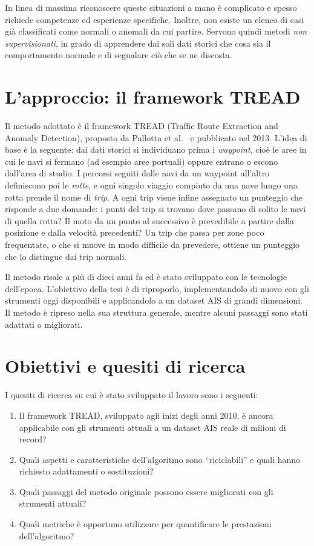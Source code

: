 In linea di massima riconoscere queste situazioni a mano è complicato e spesso richiede competenze ed esperienze
specifiche. Inoltre, non esiste un elenco di casi già classificati come normali o anomali
da cui partire.
Servono quindi metodi \emph{non supervisionati}, in grado di apprendere dai soli dati storici che cosa sia
il comportamento normale e di segnalare ciò che se ne discosta.

\section{L'approccio: il framework TREAD}\label{sec:intro_approach}

Il metodo adottato è il framework TREAD (Traffic Route Extraction and Anomaly Detection), proposto
da Pallotta et al.~\cite{pallotta} e pubblicato nel 2013.
L'idea di base è la seguente: dai dati storici si individuano prima i \emph{waypoint}, cioè le aree in cui
le navi si fermano (ad esempio aree portuali) oppure entrano o escono dall'area di studio.
I percorsi seguiti dalle navi da un waypoint all'altro definiscono poi le \emph{rotte}, e ogni singolo viaggio
compiuto da una nave lungo una rotta prende il nome di \emph{trip}.
A ogni trip viene infine assegnato un punteggio che risponde a due domande: i punti del trip si trovano dove
passano di solito le navi di quella rotta? Il moto da un punto al successivo è prevedibile a partire dalla
posizione e dalla velocità precedenti?
Un trip che passa per zone poco frequentate, o che si muove in modo difficile da prevedere, ottiene un punteggio
che lo distingue dai trip normali.

Il metodo risale a più di dieci anni fa ed è stato sviluppato con le tecnologie dell'epoca.
L'obiettivo della tesi è di riproporlo, implementandolo di nuovo con gli strumenti oggi disponibili e applicandolo
a un dataset AIS di grandi dimensioni. Il metodo è ripreso nella sua struttura generale, mentre alcuni passaggi
sono stati adattati o migliorati.

\section{Obiettivi e quesiti di ricerca}\label{sec:intro_questions}

I quesiti di ricerca su cui è stato sviluppato il lavoro sono i seguenti:
\begin{enumerate}
    \item Il framework TREAD, sviluppato agli inizi degli anni 2010, è ancora applicabile con gli strumenti attuali
          a un dataset AIS reale di milioni di record?
    \item Quali aspetti e caratteristiche dell'algoritmo sono ``riciclabili'' e quali hanno richiesto adattamenti o sostituzioni?
    \item Quali passaggi del metodo originale possono essere migliorati con gli strumenti attuali?
    \item Quali metriche è opportuno utilizzare per quantificare le prestazioni dell'algoritmo?
\end{enumerate}


